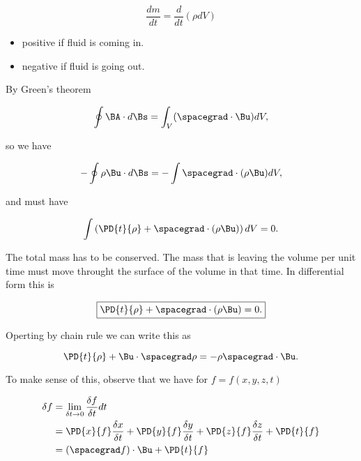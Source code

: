 \begin{equation}\label{eqn:continuumL9:390}
\frac{dm}{dt} = \frac{d}{dt} (\rho dV)
\end{equation}

\begin{itemize}
\item 
positive if fluid is coming in.
\item 
negative if fluid is going out.
\end{itemize}

By Green's theorem

\begin{equation}\label{eqn:continuumL9:410}
\oint \BA \cdot d\Bs = \int_V (\spacegrad \cdot \Bu) dV,
\end{equation}

so we have

\begin{equation}\label{eqn:continuumL9:430}
-\oint \rho \Bu \cdot d\Bs = -\int \spacegrad \cdot (\rho \Bu ) dV,
\end{equation}

and must have

\begin{equation}\label{eqn:continuumL9:450}
\int \left( \PD{t}{\rho} + \spacegrad \cdot (\rho \Bu) \right) dV = 0.
\end{equation}

The total mass has to be conserved.  The mass that is leaving the volume per unit time must move throught the surface of the volume in that time.  In differential form this is

\begin{equation}\label{eqn:continuumL9:470}
\boxed{
\PD{t}{\rho} + \spacegrad \cdot (\rho \Bu) = 0.
}
\end{equation}

Operting by chain rule we can write this as

\begin{equation}\label{eqn:continuumL9:490}
\PD{t}{\rho} + \Bu \cdot \spacegrad \rho = - \rho \spacegrad \cdot \Bu.
\end{equation}

To make sense of this, observe that we have for $f = f(x, y, z, t)$

\begin{align*}
\delta f 
&= \lim_{\delta t \rightarrow 0} \frac{\delta f}{\delta t} dt \\
&=
\PD{x}{f} \frac{\delta x}{\delta t}
+\PD{y}{f} \frac{\delta y}{\delta t}
+\PD{z}{f} \frac{\delta z}{\delta t}
+ \PD{t}{f} \\
&=
(\spacegrad f) \cdot \Bu + \PD{t}{f}
\end{align*}

